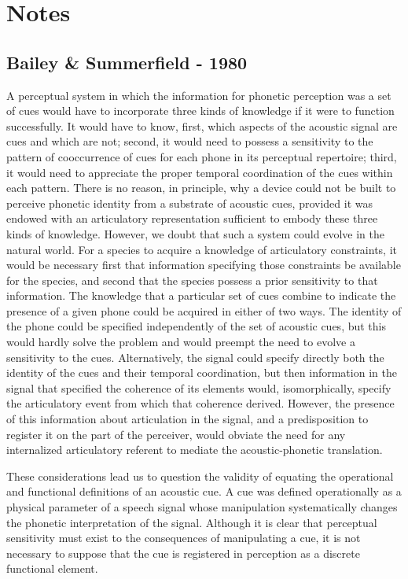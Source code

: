 \section{Notes}

\subsection{Bailey \& Summerfield - 1980}
\label{note:cues}

A perceptual system in which the information for phonetic perception was a set of cues would have to incorporate three kinds of knowledge if it were to function successfully. It would have to know, first, which aspects of the acoustic signal are cues and which are not; second, it would need to possess a sensitivity to the pattern of cooccurrence of cues for each phone in its perceptual repertoire; third, it would need to appreciate the proper temporal coordination of the cues within each pattern. There is no reason, in principle, why a device could not be built to perceive phonetic identity from a substrate of acoustic cues, provided it was endowed with an articulatory representation sufficient to embody these three kinds of knowledge. However, we doubt that such a system could evolve in the natural world. For a species to acquire a knowledge of articulatory constraints, it would be necessary first that information specifying those constraints be available for the species, and second that the species possess a prior sensitivity to that information. The knowledge that a particular set of cues combine to indicate the presence of a given phone could be acquired in either of two ways. The identity of the phone could be specified independently of the set of acoustic cues, but this would hardly solve the problem and would preempt the need to evolve a sensitivity to the cues. Alternatively, the signal could specify directly both the identity of the cues and their temporal coordination, but then information in the signal that specified the coherence of its elements would, isomorphically, specify the articulatory event from which that coherence derived. However, the presence of this information about articulation in the signal, and a predisposition to register it on the part of the perceiver, would obviate the need for any internalized articulatory referent to mediate the acoustic-phonetic translation.

These considerations lead us to question the validity of equating the operational and functional definitions of an acoustic cue. A cue was defined operationally as a physical parameter of a speech signal whose manipulation systematically changes the phonetic interpretation of the signal. Although it is clear that perceptual sensitivity must exist to the consequences of manipulating a cue, it is not necessary to suppose that the cue is registered in perception as a discrete functional element.\citep{Bailey1980}
